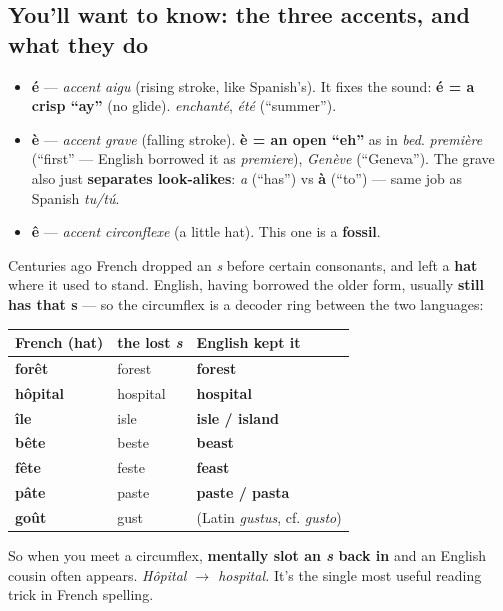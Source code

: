 \subsection*{You'll want to know: the three accents, and what they do}
\begin{itemize}
\raggedright
  \item \textbf{é} — \emph{accent aigu} (rising stroke, like Spanish's). It fixes the sound: \textbf{é = a crisp \textquotedblleft{}ay\textquotedblright{}} (no glide). \emph{enchanté}, \emph{été} (\textquotedblleft{}summer\textquotedblright{}).
  \item \textbf{è} — \emph{accent grave} (falling stroke). \textbf{è = an open \textquotedblleft{}eh\textquotedblright{}} as in \emph{bed}. \emph{première} (\textquotedblleft{}first\textquotedblright{} — English borrowed it as \emph{premiere}), \emph{Genève} (\textquotedblleft{}Geneva\textquotedblright{}). The grave also just \textbf{separates look-alikes}: \emph{a} (\textquotedblleft{}has\textquotedblright{}) vs \textbf{à} (\textquotedblleft{}to\textquotedblright{}) — same job as Spanish \emph{tu/tú}.
  \item \textbf{ê} — \emph{accent circonflexe} (a little hat). This one is a \textbf{fossil}.
\end{itemize}

\begin{culture}
Centuries ago French dropped an \emph{s} before certain consonants, and left a \textbf{hat} where it used to stand. English, having borrowed the older form, usually \textbf{still has that s} — so the circumflex is a decoder ring between the two languages:

\noindent
\begin{tabularx}{\linewidth}{@{}>{\raggedright\arraybackslash}X>{\raggedright\arraybackslash}X>{\raggedright\arraybackslash}X@{}}
\toprule
\textbf{French (hat)} & \textbf{the lost \emph{s}} & \textbf{English kept it} \\
\midrule
\textbf{forêt} & forest & \textbf{forest} \\
\textbf{hôpital} & hospital & \textbf{hospital} \\
\textbf{île} & isle & \textbf{isle / island} \\
\textbf{bête} & beste & \textbf{beast} \\
\textbf{fête} & feste & \textbf{feast} \\
\textbf{pâte} & paste & \textbf{paste / pasta} \\
\textbf{goût} & gust & (Latin \emph{gustus}, cf. \emph{gusto}) \\
\bottomrule
\end{tabularx}

So when you meet a circumflex, \textbf{mentally slot an \emph{s} back in} and an English cousin often appears. \emph{Hôpital $\to$ hospital.} It's the single most useful reading trick in French spelling.
\end{culture}

